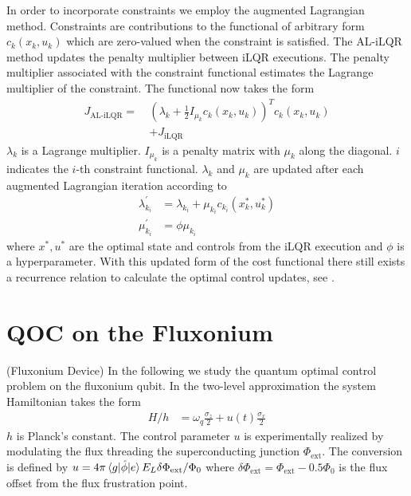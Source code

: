 \documentclass[
  amsfonts,
  amsmath,
  tbtags,
  amssymb,
  aps,
  nobibnotes,
  prl,
  twocolumn,
]{revtex4-2}
\begin{document}
In order to incorporate constraints we employ
the augmented Lagrangian method. Constraints are contributions
to the functional of arbitrary form $c_{k}(x_{k}, u_{k})$ which are
zero-valued when the constraint is satisfied. The AL-iLQR
method updates the penalty multiplier between
iLQR executions. The penalty multiplier associated with the
constraint functional estimates the Lagrange multiplier of
the constraint. The functional now takes the form
\begin{equation}
  \begin{aligned}
    J_{\textrm{AL-iLQR}} = \ &(\lambda_{k} + \frac{1}{2}I_{\mu_{k}} c_{k}(x_{k}, u_{k}))^{T} c_{k}(x_{k}, u_{k})\\
    &+ J_{\textrm{iLQR}}
  \end{aligned}
\end{equation}
$\lambda_{k}$ is a Lagrange multiplier. $I_{\mu_{k}}$ is a penalty matrix
with $\mu_{k}$ along the diagonal. $i$ indicates the $i$-th constraint functional.
$\lambda_{k}$ and $\mu_{k}$ are updated after each augmented Lagrangian iteration according to
\begin{align}
  \lambda_{k_{i}}^{'} &= \lambda_{k_{i}} + \mu_{k_{i}} c_{k_{i}}(x_{k}^{*}, u_{k}^{*})\\
  \mu_{k_{i}}^{'} &= \phi \mu_{k_{i}}
\end{align}
where $x^{*}, u^{*}$ are the optimal state and controls from the iLQR execution
and $\phi$ is a hyperparameter. With this updated form of the cost
functional there still exists a recurrence relation to calculate the optimal control
updates, see \cite{howell2019altro}.

\section{QOC on the Fluxonium}
(Fluxonium Device) In the following we study
the quantum optimal control problem on the fluxonium qubit.
In the two-level
approximation the system Hamiltonian takes the form
\label{hamiltonian}
\begin{align}
  H/h &= \omega_{q} \frac{\sigma_{z}}{2} + u(t) \frac{\sigma_{x}}{2}
\end{align}
$h$ is Planck's constant. The control parameter $u$ is experimentally
realized by modulating the flux 
threading the superconducting junction $\Phi_{\textrm{ext}}$.
The conversion is defined by
$u = 4 \pi \braket{g \lvert \hat{\phi} \rvert e} E_{L} \delta \Phi_{\textrm{ext}} / \Phi_{0}$
where $\delta \Phi_{\textrm{ext}} = \Phi_{\textrm{ext}} - 0.5 \Phi_{0}$ is the flux
offset from the flux frustration point.
\end{document}

